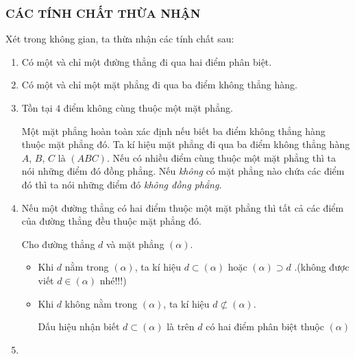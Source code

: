 \subsubsection{CÁC TÍNH CHẤT THỪA NHẬN}
Xét trong không gian, ta thừa nhận các tính chất sau:
\begin{enumerate}[\iconMT]
	\item {} Có một và chỉ một đường thẳng đi qua hai điểm phân biệt.
	\item {} Có một và chỉ một mặt phẳng đi qua ba điểm không thẳng hàng.
	\item {} Tồn tại $4$ điểm không cùng thuộc một mặt phẳng.
	\begin{tcolorbox}[colframe=cyan,colback=cyan!3!white,boxrule=0.5mm]
		Một mặt phẳng hoàn toàn xác định nếu biết ba điểm không thẳng hàng thuộc mặt phẳng đó. Ta kí hiệu mặt phẳng đi qua ba điểm không thẳng hàng $A$, $B$, $C$ là $(A B C)$. Nếu có nhiều điểm cùng thuộc một mặt phẳng thì ta nói những điểm đó đồng phẳng. Nếu \textit{không} có mặt phẳng nào chứa các điểm đó thì ta nói những điểm đó \textit{không đồng phẳng}.
	\end{tcolorbox}
	\item {} Nếu một đường thẳng có hai điểm thuộc một mặt phẳng thì tất cả các điểm của đường thẳng đều thuộc mặt phẳng đó.\\
	\begin{tcolorbox}[colframe=cyan,colback=cyan!3!white,boxrule=0.5mm]
		Cho đường thẳng $d$ và mặt phẳng $(\alpha)$.
		\begin{itemize}
			\item [\ding{172}] Khi $d$ nằm trong $(\alpha)$, ta kí hiệu $d \subset (\alpha)$ hoặc $(\alpha) \supset d$ .\quad (không được viết  $d \in (\alpha)$ nhé!!!)
			\item [\ding{173}] Khi $d$ không nằm trong $(\alpha)$, ta kí hiệu $d \not\subset (\alpha)$.
			\begin{luuy}
				Dấu hiệu nhận biết $d \subset (\alpha)$  là trên $d$ có hai điểm phân biệt thuộc $(\alpha)$
			\end{luuy}
		\end{itemize}
	\end{tcolorbox}
	\item {} 
\end{enumerate}
